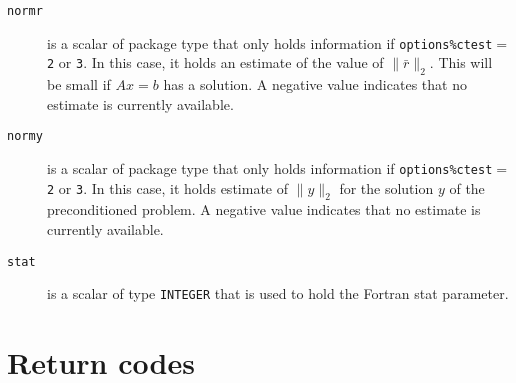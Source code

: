 \begin{description}
\item[\texttt{normr}] is a scalar of package type that
   only holds information if {\tt options\%ctest}$ =${\tt 2} or {\tt 3}.
   In this case, it holds an estimate of the  value of $\|\bar{r}\|_2$.
   This will be small if $Ax = b$ has a solution. A negative value
   indicates that no estimate is currently available.
    
\item[\texttt{normy}] is a scalar of package type that
   only holds information if {\tt options\%ctest}$ =${\tt 2} or {\tt 3}.
   In this case, it holds estimate of  $\|y\|_2$ for the  solution $y$
   of the preconditioned problem.
   A negative value indicates that no estimate is currently available.

\item[\texttt{stat}] is a scalar of type  {\tt INTEGER} that is used to hold
   the Fortran stat parameter.

\end{description}



\section{Return codes} \label{LSMR:errors}

